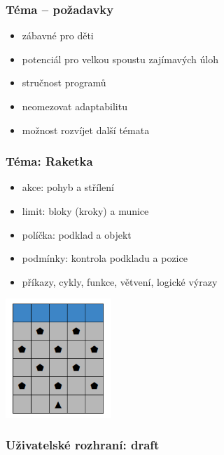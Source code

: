 \documentclass[xcolor=dvipsnames, 14pt]{beamer}
\newcommand{\imageW}[1]{%
  \makebox[\textwidth][c]{\texttt{[image: img/\#1]}}}
\begin{document}
\begin{frame}
\frametitle{Téma -- požadavky}
\begin{itemize}
\item zábavné pro děti
\item potenciál pro velkou spoustu zajímavých úloh
\item stručnost programů
\item neomezovat adaptabilitu
\item možnost rozvíjet další témata
\end{itemize}
\end{frame}

\begin{frame}
\frametitle{Téma: Raketka}
\begin{itemize}
\item akce: pohyb a střílení
\item limit: bloky (kroky) a munice
\item políčka: podklad a objekt
\item podmínky: kontrola podkladu a pozice
\item příkazy, cykly, funkce, větvení, logické výrazy
\end{itemize}
\centering\includegraphics[width=0.3\textwidth]{img/raketka.png}
\end{frame}

\begin{frame}
\frametitle{Uživatelské rozhraní: draft}
\imageW{new-user-interface-1.png}
\end{frame}
\end{document}
